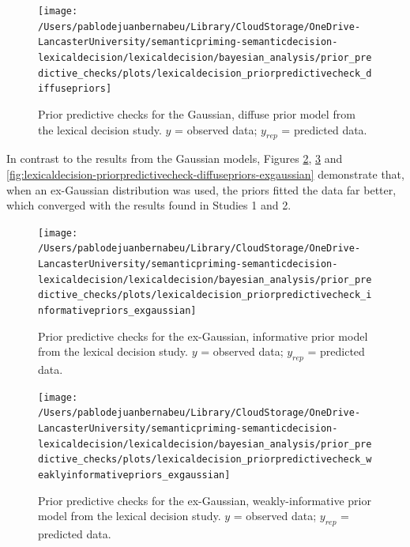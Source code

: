 \documentclass[
  12pt,
  man,floatsintext]{apa7}
\begin{document}
\begin{figure}

{\centering \texttt{[image: /Users/pablodejuanbernabeu/Library/CloudStorage/OneDrive-LancasterUniversity/semanticpriming-semanticdecision-lexicaldecision/lexicaldecision/bayesian\_analysis/prior\_predictive\_checks/plots/lexicaldecision\_priorpredictivecheck\_diffusepriors]} 

}

\caption{Prior predictive checks for the Gaussian, diffuse prior model from the lexical decision study. \(y\) = observed data; \(y_{rep}\) = predicted data.}\label{fig:lexicaldecision-priorpredictivecheck-diffusepriors}
\end{figure}

In contrast to the results from the Gaussian models, Figures \ref{fig:lexicaldecision-priorpredictivecheck-informativepriors-exgaussian}, \ref{fig:lexicaldecision-priorpredictivecheck-weaklyinformativepriors-exgaussian} and \ref{fig:lexicaldecision-priorpredictivecheck-diffusepriors-exgaussian} demonstrate that, when an ex-Gaussian distribution was used, the priors fitted the data far better, which converged with the results found in Studies 1 and 2.



\begin{figure}

{\centering \texttt{[image: /Users/pablodejuanbernabeu/Library/CloudStorage/OneDrive-LancasterUniversity/semanticpriming-semanticdecision-lexicaldecision/lexicaldecision/bayesian\_analysis/prior\_predictive\_checks/plots/lexicaldecision\_priorpredictivecheck\_informativepriors\_exgaussian]} 

}

\caption{Prior predictive checks for the ex-Gaussian, informative prior model from the lexical decision study. \(y\) = observed data; \(y_{rep}\) = predicted data.}\label{fig:lexicaldecision-priorpredictivecheck-informativepriors-exgaussian}
\end{figure}



\begin{figure}

{\centering \texttt{[image: /Users/pablodejuanbernabeu/Library/CloudStorage/OneDrive-LancasterUniversity/semanticpriming-semanticdecision-lexicaldecision/lexicaldecision/bayesian\_analysis/prior\_predictive\_checks/plots/lexicaldecision\_priorpredictivecheck\_weaklyinformativepriors\_exgaussian]} 

}

\caption{Prior predictive checks for the ex-Gaussian, weakly-informative prior model from the lexical decision study. \(y\) = observed data; \(y_{rep}\) = predicted data.}\label{fig:lexicaldecision-priorpredictivecheck-weaklyinformativepriors-exgaussian}
\end{figure}
\end{document}
